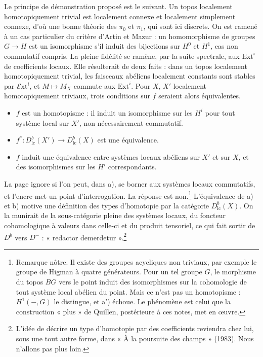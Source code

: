 \documentclass[11pt,a4paper]{article}
\begin{document}
Le principe de démonstration proposé est le suivant. Un topos localement
homotopiquement trivial est localement connexe et localement simplement
connexe, d'où une bonne théorie des $\pi_0$ et $\pi_1$, qui sont ici discrets.
On est ramené à un cas particulier du critère d'Artin et Mazur : un
homomorphisme de groupes $G \to H$ est un isomorphisme s'il induit des
bijections sur $H^{0}$ et $H^{1}$, cas non commutatif compris. La pleine
fidélité se ramène, par la suite spectrale, aux $\mathrm{Ext}^{i}$ de
coefficients locaux. Elle résulterait de deux faits : dans un topos localement
homotopiquement trivial, les faisceaux abéliens localement constants sont
stables par $\mathcal{E}\mathrm{xt}^{i}$, et $M \mapsto M_X$ commute aux
$\mathrm{Ext}^{i}$. Pour $X$, $X'$ localement homotopiquement triviaux, trois
conditions sur $f$ seraient alors équivalentes.
\begin{itemize}
  \item[a)] $f$ est un homotopisme : il induit un isomorphisme sur les $H^{i}$
  pour tout système local sur $X'$, non nécessairement commutatif.
  \item[b)] $f^{*} : D^{b}_{\mathrm{lc}}(X') \to D^{b}_{\mathrm{lc}}(X)$ est une
  équivalence.
  \item[a')] $f$ induit une équivalence entre systèmes locaux abéliens sur $X'$
  et sur $X$, et des isomorphismes sur les $H^{i}$ correspondants.
\end{itemize}
La page ignore si l'on peut, dans a), se borner aux systèmes locaux
commutatifs, et l'encre met un point d'interrogation. La réponse est
non.\footnote{Remarque nôtre. Il existe des groupes acycliques non triviaux, par
exemple le groupe de Higman à quatre générateurs. Pour un tel groupe $G$, le
morphisme du topos $BG$ vers le point induit des isomorphismes sur la
cohomologie de tout système local abélien du point. Mais ce n'est pas un
homotopisme : $H^{1}(-, G)$ le distingue, et a') échoue. Le phénomène est celui
que la construction « plus » de Quillen, postérieure à ces notes, met en
œuvre.} L'équivalence de a) et b) motive une définition des types d'homotopie
par la catégorie $D^{b}_{\mathrm{lc}}(X)$. On la munirait de la sous-catégorie
pleine des systèmes locaux, du foncteur cohomologique à valeurs dans celle-ci et
du produit tensoriel, ce qui fait sortir de $D^{b}$ vers $D^{-}$ : « redactor
demerdetur ».\footnote{L'idée de décrire un type d'homotopie par des
coefficients reviendra chez lui, sous une tout autre forme, dans « À la
poursuite des champs » (1983). Nous n'allons pas plus loin.}
\end{document}
